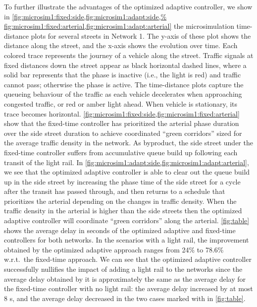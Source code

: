 To further illustrate the advantages of the optimized adaptive controller, we show
in \cref{fig:microsim1:fixed:side,fig:microsim1:adapt:side,%
fig:microsim1:fixed:arterial,fig:microsim1:adapt:arterial} the microsimulation
time-distance plots for several streets in Network 1.
%
The y-axis of these plot shows the distance along the street, and the x-axis
shows the evolution over time.
%
Each colored trace represents the journey of a vehicle along the street.
%
Traffic signals at fixed distances down the street appear as black horizontal
dashed lines, where a solid bar represents that the phase is inactive (i.e., the
light is red) and traffic cannot pass; otherwise the phase is active.
%
%
The time-distance plots capture the queueing behaviour of the traffic as each
vehicle decelerates when approaching congested traffic, or red or amber light
ahead.
%
When vehicle is stationary, its trace becomes horizontal.
%
\cref{fig:microsim1:fixed:side,fig:microsim1:fixed:arterial} show that the
fixed-time controller has prioritized the arterial phase duration over the
side street duration to achieve coordinated ``green corridors'' sized for the
average traffic density in the network.
%
As byproduct, the side street under the fixed-time controller suffers from
accumulative queue build up following each transit of the light rail.
%
In \cref{fig:microsim1:adapt:side,fig:microsim1:adapt:arterial}, we see that the
optimized adaptive controller is able to clear out the queue build up in the
side street by increasing the phase time of the side street for a cycle after
the transit has passed through, and then returns to a schedule that prioritizes
the arterial depending on the changes in traffic density.
%
When the traffic density in the arterial is higher than the side streets then
the optimized adaptive controller will coordinate ``green corridors'' along the
arterial.
%
\cref{fig:table} shows the average delay in seconds of the optimized
adaptive and fixed-time controllers for both networks.
%
In the scenarios with a light rail, the improvement obtained by the optimized
adaptive approach ranges from 24\% to 78.6\% w.r.t.\ the fixed-time approach.
%
We can see that the optimized adaptive controller successfully nullifies the
impact of adding a light rail to the networks since the average delay obtained
by it is approximately the same as the average delay for the fixed-time
controller with no light rail:
%
the average delay increased by at most 8 s, and the average delay decreased in
the two cases marked with \cellSymbol in \cref{fig:table}.

